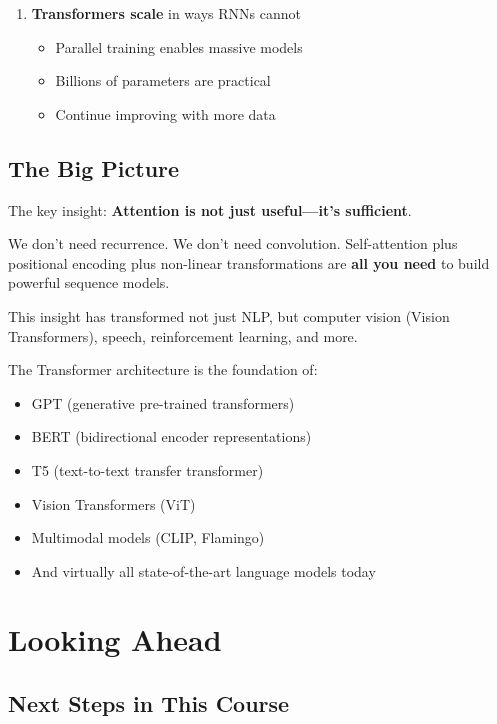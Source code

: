 \documentclass{article}
\begin{document}
\begin{enumerate}
\item \textbf{Transformers scale} in ways RNNs cannot
\begin{itemize}
\item Parallel training enables massive models
\item Billions of parameters are practical
\item Continue improving with more data
\end{itemize}
\end{enumerate}

\subsection{The Big Picture}

\begin{tcolorbox}[colback=blue!5!white, colframe=blue!75!black, title=The Attention Revolution]
The key insight: \textbf{Attention is not just useful---it's sufficient}.

We don't need recurrence. We don't need convolution. Self-attention plus positional encoding plus non-linear transformations are \textbf{all you need} to build powerful sequence models.

This insight has transformed not just NLP, but computer vision (Vision Transformers), speech, reinforcement learning, and more.

The Transformer architecture is the foundation of:
\begin{itemize}
\item GPT (generative pre-trained transformers)
\item BERT (bidirectional encoder representations)
\item T5 (text-to-text transfer transformer)
\item Vision Transformers (ViT)
\item Multimodal models (CLIP, Flamingo)
\item And virtually all state-of-the-art language models today
\end{itemize}
\end{tcolorbox}

\section{Looking Ahead}

\subsection{Next Steps in This Course}
\end{document}
